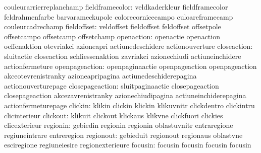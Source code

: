                            couleurarrierreplanchamp
          fieldframecolor: veldkaderkleur            fieldframecolor
                           feldrahmenfarbe           barvarameckupole
                           colorecornicecampo        culoareframecamp
                           couleurcadrechamp
              fieldoffset: veldoffset                fieldoffset
                           feldoffset                offsetpole
                           offsetcampo               offsetcamp
                           offsetchamp
               openaction: openactie                 openaction
                           oeffenaktion              otevriakci
                           azioneapri                actiunedeschidere
                           actionouverture
              closeaction: sluitactie                closeaction
                           schliessenaktion          zavriakci
                           azionechiudi              actiuneinchidere
                           actionfermeture
           openpageaction: openpaginaactie           openpageaction
                           openpageaction            akceotevrenistranky
                           azioneapripagina          actiunedeschiderepagina
                           actionouverturepage
          closepageaction: sluitpaginaactie          closepageaction
                           closepageaction           akcezavrenistranky
                           azionechiudipagina        actiuneinchiderepagina
                           actionfermeturepage
                  clickin: klikin                    clickin
                           klickin                   klikuvnitr
                           clickdentro               clickintru
                           clicinterieur
                 clickout: klikuit                   clickout
                           klickaus                  klikvne
                           clickfuori                clickies
                           clicexterieur
                 regionin: gebiedin                  regionin
                           regionin                  oblastuvnitr
                           entraregione              regiuneintrare
                           entreregion
                regionout: gebieduit                 regionout
                           regionaus                 oblastvne
                           esciregione               regiuneiesire
                           regionexterieure
                  focusin: focusin                   focusin
                           focusin                   focusin

